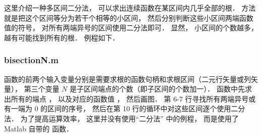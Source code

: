 

这里介绍一种多区间二分法， 可以求出连续函数在某区间内几乎全部的根． 方法就是把这个区间等分为若干个相等的小区间， 然后分别判断这些小区间两端函数值的符号， 对所有两端异号的区间使用二分法即可． 显然， 小区间的个数越多， 越有可能找到所有的根． 例程如下．

\subsubsection{bisectionN.m}


函数的前两个输入变量分别是需要求根的函数句柄和求根区间（二元行矢量或列矢量）， 第三个变量 $N$ 是子区间端点的个数（即子区间的个数加一）． 函数中先求出所有的端点 ， 以及对应的函数值 ， 然后画图． 第 6-7 行寻找所有两端异号或有一端为 0 的区间的序号， 然后在第 10 行的循环中对这些区间逐个使用二分法． 为了提高运算效率， 这里并没有使用“二分法” 中的例程， 而是使用了 Matlab 自带的  函数．

